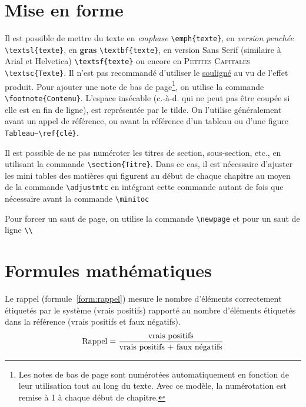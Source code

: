 \documentclass{report}
\begin{document}

\section{Mise en forme}
Il est possible de mettre du texte en \emph{emphase}
\verb+\emph{texte}+, en \textsl{version penchée}
\verb+\textsl{texte}+, en \textbf{gras} \verb+\textbf{texte}+, en
version \textsf{Sans Serif} (similaire à Arial et Helvetica)
\verb+\textsf{texte}+ ou encore en \textsc{Petites Capitales}
\verb+\textsc{Texte}+. Il n'est pas recommandé d'utiliser le
\underline{souligné} au vu de l'effet produit. Pour ajouter une note
de bas de page\footnote{Les notes de bas de page sont numérotées
  automatiquement en fonction de leur utilisation tout au long du
  texte. Avec ce modèle, la numérotation est remise à 1 à chaque début
  de chapitre.}, on utilise la commande
\verb+\footnote{Contenu}+. L'espace insécable (c.-à-d. qui ne peut pas
être coupée si elle est en fin de ligne), est représentée par le
tilde. On l'utilise généralement avant un appel de référence, ou avant
la référence d'un tableau ou d'une figure \verb+Tableau~\ref{clé}+.

Il est possible de ne pas numéroter les titres de section,
sous-section, etc., en utilisant la commande
\verb+\section{Titre}+. Dans ce cas, il est nécessaire d'ajuster les
mini tables des matières qui figurent au début de chaque chapitre au
moyen de la commande \verb+\adjustmtc+ en intégrant cette commande
autant de fois que nécessaire avant la commande \verb+\minitoc+

Pour forcer un saut de page, on utilise la commande \verb+\newpage+ et
pour un saut de ligne \verb+\\+



\section{Formules mathématiques}
 Le rappel (formule~\ref{form:rappel}) mesure le nombre
d'éléments correctement étiquetés par le système (vrais positifs)
rapporté au nombre d'éléments étiquetés dans la référence (vrais
positifs et faux négatifs).
%
\begin{equation}
  \centering
  \text{Rappel} = {{\text{vrais positifs}}\over{\text{vrais positifs + faux négatifs}}}
  \label{form:rappel}
\end{equation}
\end{document}

